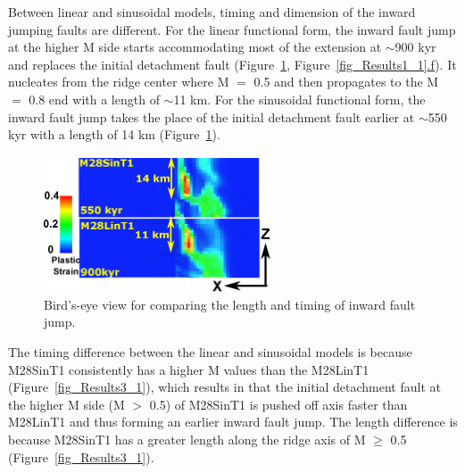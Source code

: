 Between linear and sinusoidal models, timing and dimension of the inward jumping faults are different. For the linear functional form, the inward fault jump at the higher M side starts accommodating most of the extension at $\sim$900 kyr and replaces the initial detachment fault (Figure~\hyperref[fig_Results4_2]{\ref{fig_Results4_2}}, Figure~\hyperref[fig_Results1_1]{\ref{fig_Results1_1}.f}). It nucleates from the ridge center where M $=$ 0.5 and then propagates to the M $=$ 0.8 end with a length of $\sim$11 km. 
For the sinusoidal functional form, the inward fault jump takes the place of the initial detachment fault earlier at $\sim$550 kyr with a length of 14 km (Figure~\hyperref[fig_Results4_2]{\ref{fig_Results4_2}}).

\begin{figure}[h]
  \centering
    \includegraphics[width=0.6\textwidth]{./Figures/fig_Results4_2_secondary_fault_length_comparison1.eps}
  \caption{Bird's-eye view for comparing the length and timing of inward fault jump.}
 \label{fig_Results4_2}
\end{figure}   

The timing difference between the linear and sinusoidal models is because M28SinT1 consistently has a higher M values than the M28LinT1 (Figure~\hyperref[fig_Results3_1]{\ref{fig_Results3_1}}), which results in that the initial detachment fault at the higher M side (M $>$ 0.5) of M28SinT1 is pushed off axis faster than M28LinT1 and thus forming an earlier inward fault jump. The length difference is because M28SinT1 has a greater length along the ridge axis of M $\ge$ 0.5 (Figure~\hyperref[fig_Results3_1]{\ref{fig_Results3_1}}). 

